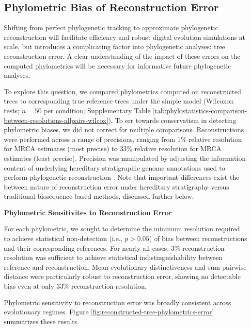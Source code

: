 \subsection{Phylometric Bias of Reconstruction Error}
\label{sec:phylometric-bias-reconstruction-error}

Shifting from perfect phylogenetic tracking to approximate phylogenetic reconstruction will facilitate efficiency and robust digital evolution simulations at scale, but introduces a complicating factor into phylogenetic analyses: tree reconstruction error.
A clear understanding of the impact of these errors on the computed phylometrics will be necessary for informative future phylogenetic analyses.

To explore this question, we compared phylometrics computed on reconstructed trees to corresponding true reference trees under the simple model (Wilcoxon tests; $n=50$ per condition; Supplementary Table \ref{tab:phylostatistics-comparison-between-resolutions-allpairs-wilcox}).
To err towards conservatism in detecting phylometric biases, we did not correct for multiple comparisons.
Reconstructions were performed across a range of precisions, ranging from 1\% relative resolution for MRCA estimates (most precise) to 33\% relative resolution for MRCA estimates (least precise).
Precision was manipulated by adjusting the information content of underlying hereditary stratigraphic genome annotations used to perform phylogenetic reconstruction \citep{moreno2022hereditary}.
Note that important differences exist the between nature of reconstruction error under hereditary stratigraphy versus traditional biosequence-based methods, discussed further below.



\noindent
\textbf{Phylometric Sensitivites to Reconstruction Error}

\noindent
For each phylometric, we sought to determine the minimum resolution required to achieve statistical non-detection (i.e., $p > 0.05$) of bias between reconstructions and their corresponding references.
For nearly all cases, 3\% reconstruction resolution was sufficient to achieve statistical indistinguishability between reference and reconstruction.
Mean evolutionary distinctiveness and sum pairwise distance were particularly robust to reconstruction error, showing no detectable bias even at only 33\% reconstruction resolution.

Phylometric sensitivity to reconstruction error was broadly consistent across evolutionary regimes.
Figure \ref{fig:reconstructed-tree-phylometrics-error} summarizes these results.

